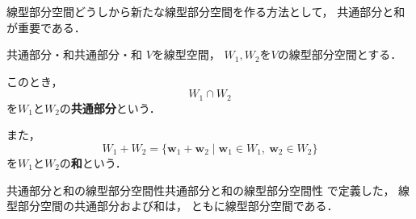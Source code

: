 線型部分空間どうしから新たな線型部分空間を作る方法として，
共通部分と和が重要である．

\begin{definition}{共通部分・和}{共通部分・和}
  $V$を線型空間，
  $W_1,W_2$を$V$の線型部分空間とする．

  このとき，
  \[
  W_1\cap W_2
  \]
  を$W_1$と$W_2$の\textbf{共通部分}という．

  また，
  \[
  W_1+W_2
  =
  \{
  \bm{w}_1+\bm{w}_2
  \mid
  \bm{w}_1\in W_1,\
  \bm{w}_2\in W_2
  \}
  \]
  を$W_1$と$W_2$の\textbf{和}という．
\end{definition}

\begin{prop}{共通部分と和の線型部分空間性}{共通部分と和の線型部分空間性}
  で定義した，
  線型部分空間の共通部分および和は，
  ともに線型部分空間である．
\end{prop}

